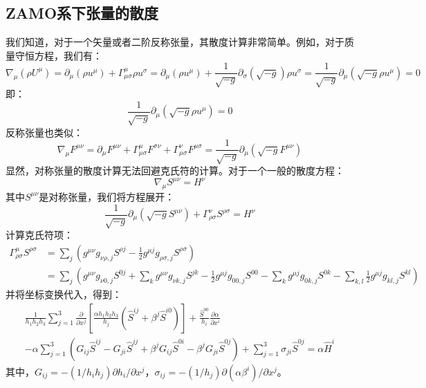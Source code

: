 \documentclass[lang=cn,color=blue,cm,11pt,scheme=chinese,bibend=bibtex,sorting=nty]{elegantbook}
\begin{document}
	\subsection{ZAMO系下张量的散度}
	
	我们知道，对于一个矢量或者二阶反称张量，其散度计算非常简单。例如，对于质量守恒方程，我们有：
	\begin{equation}
		\nabla_{\mu} (\rho U^{\mu}) = \partial_{\mu} (\rho u^{\mu}) + \Gamma^{\mu}_{\mu \sigma} \rho u^{\sigma} = \partial_{\mu} (\rho u^{\mu}) + \frac{1}{\sqrt{- g}} \partial_{\sigma} (\sqrt{- g}) \rho u^{\sigma} = \frac{1}{\sqrt{- g}} \partial_{\mu} \left( \sqrt{- g} \rho u^{\mu} \right) = 0
	\end{equation}
	即：
	\begin{equation}
		\frac{1}{\sqrt{- g}} \partial_{\mu} \left( \sqrt{- g} \rho u^{\mu} \right) = 0
	\end{equation}
	反称张量也类似：
	\begin{equation}
		\nabla_{\mu} F^{\mu \nu} = \partial_{\mu} F^{\mu \nu} + \Gamma^{\mu}_{\mu \sigma} F^{\sigma \nu} + \Gamma^{\nu}_{\mu \sigma} F^{\mu \sigma} = \frac{1}{\sqrt{- g}} \partial_{\mu} \left( \sqrt{- g} F^{\mu \nu} \right)
	\end{equation}
	显然，对称张量的散度计算无法回避克氏符的计算。对于一个一般的散度方程：
	\begin{equation}
		\nabla_{\mu} S^{\mu \nu} = H^{\nu}
	\end{equation}
	其中$S^{\mu \nu}$是对称张量，我们将方程展开：
	\begin{equation}
		\frac{1}{\sqrt{- g}} \partial_{\mu} \left( \sqrt{- g} S^{\mu \nu} \right) + \Gamma^{\nu}_{\rho \sigma} S^{\rho \sigma} = H^{\nu}
	\end{equation}
	计算克氏符项：
	\begin{equation}
		\begin{aligned}
			\Gamma^{\mu}_{\rho \sigma} S^{\rho \sigma} & = \sum_j \left( g^{\mu \nu} g_{\nu \rho, j} S^{\rho j} - \frac{1}{2} g^{\mu j} g_{\rho \sigma, j} S^{\rho \sigma} \right)\\
			& = \sum_j \left( g^{\mu \nu} g_{\nu 0, j} S^{0 j} + \sum_k g^{\mu \nu} g_{\nu k, j} S^{j k} - \frac{1}{2} g^{\mu j} g_{00, j} S^{00} - \sum_k g^{\mu j} g_{0 k, j} S^{0 k} - \sum_{k, l} \frac{1}{2} g^{\mu j} g_{k l, j} S^{k l} \right)
		\end{aligned}
	\end{equation}
	并将坐标变换代入，得到：
	\begin{multline}
		\frac{1}{h_1 h_2 h_3} \sum_{j = 1}^3 \frac{\partial}{\partial x^j} \left[ \frac{\alpha h_1 h_2 {h_3} }{h_j} (\hat{S}^{i j} + \beta^j \hat{S}^{i 0}) \right] + \frac{\hat{S}^{00}}{h_i} \frac{\partial \alpha}{\partial x^i} \\
		- \alpha \sum_{j = 1}^3 (G_{i j} \hat{S}^{i j} - G_{j i} \hat{S}^{j j} + \beta^j G_{i j} \hat{S}^{0 i} - \beta^j G_{j i} \hat{S}^{0 j}) + \sum_{j = 1}^3 \sigma_{j i} \hat{S}^{0 j} = \alpha \hat{H}^i
	\end{multline}
	其中，$G_{i j} = - (1 / h_i h_j) \partial h_i / \partial x^j$，$\sigma_{i j} = - (1 / h_j) \partial (\alpha \beta^i) / \partial x^j$。
	
\end{document}
